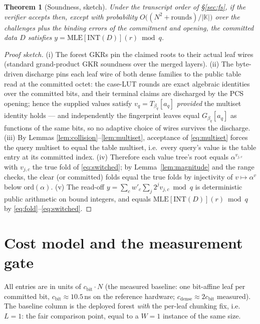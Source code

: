 \documentclass[11pt]{article}
\newtheorem{theorem}{Theorem}[section]
\theoremstyle{definition}
\newcommand{\K}{\mathbb{K}}
\newcommand{\INT}{\mathrm{INT}}
\newcommand{\MLE}{\mathrm{MLE}}
\newcommand{\ord}{\mathrm{ord}}
\begin{document}
\begin{theorem}[Soundness, sketch]\label{thm:sound}
Under the transcript order of \S\ref{sec:fs}, if the verifier accepts
then, except with probability
$O\!\bigl((N^2 + \mathrm{rounds})/|\K|\bigr)$ over the challenges plus
the binding errors of the commitment and opening, the committed data $D$
satisfies $y=\MLE[\INT(D)](r)\bmod q$.
\end{theorem}
\begin{proof}[Proof sketch]
(i) The forest GKRs pin the claimed roots to their actual leaf wires
(standard grand-product GKR soundness over the merged layers).
(ii) The byte-driven discharge pins each leaf wire of both dense
families to the public table read at the committed octet: the case-LUT
rounds are exact algebraic identities over the committed bits, and their
terminal claims are discharged by the PCS opening; hence the supplied
values satisfy $v_q=T_{\beta_q}[a_q]$ \emph{provided} the multiset
identity holds --- and independently the fingerprint leaves equal
$G_{\beta_q}[a_q]$ as functions of the same bits, so no adaptive choice
of wires survives the discharge. (iii) By Lemmas
\ref{lem:collision}--\ref{lem:multiset}, acceptance of
\eqref{eq:multiset} forces the query multiset to equal the table
multiset, i.e.\ every query's value is the table entry at its committed
index. (iv) Therefore each value tree's root equals
$\alpha^{v_{j,c}}$ with $v_{j,c}$ the true fold of
\eqref{eq:switched}; by Lemma~\ref{lem:magnitude} and the range checks,
the clear (or committed) folds equal the true folds by injectivity of
$v\mapsto\alpha^v$ below $\ord(\alpha)$. (v) The read-off
$y=\sum_c w'_c\sum_j 2^j v_{j,c}\bmod q$ is deterministic public
arithmetic on bound integers, and equals $\MLE[\INT(D)](r)\bmod q$ by
\eqref{eq:fold}--\eqref{eq:switched}.
\end{proof}

\section{Cost model and the measurement gate}\label{sec:costs}

All entries are in units of $c_{\mathrm{bit}}\cdot N$ (the measured
baseline: one bit-affine leaf per committed bit,
$c_{\mathrm{bit}}\approx 10.5$\,ns on the reference hardware;
$c_{\mathrm{dense}}\approx 2c_{\mathrm{bit}}$ measured). The baseline
column is the deployed forest \emph{with} the per-leaf chunking fix,
i.e.\ $L=1$: the fair comparison point, equal to a $W=1$ instance of the
same size.
\end{document}
